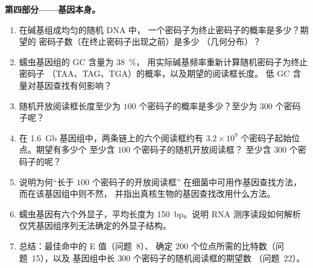 \begin{problem}
\medskip
\noindent\textbf{第四部分——基因本身。}
\begin{enumerate}[resume]
  \item 在碱基组成均匀的随机 DNA 中，
        一个密码子为终止密码子的概率是多少？期望的
        密码子数（在终止密码子出现之前）是多少
        （几何分布）？
  \item 蠕虫基因组的 GC 含量为 \qty{38}{\%}，
        用实际碱基频率重新计算随机密码子为终止密码子
        （TAA、TAG、TGA）的概率，以及期望的阅读框长度。
        低 GC 含量对基因查找有何影响？
  \item 随机开放阅读框长度至少为
        $100$ 个密码子的概率是多少？至少为 $300$ 个密码子呢？
  \item 在 \qty{1.6}{Gb} 基因组中，两条链上的六个阅读框约有
        $3.2\times 10^{9}$ 个密码子起始位点。期望有多少个
        至少含 $100$ 个密码子的随机开放阅读框？
        至少含 $300$ 个密码子的呢？
  \item 说明为何“长于 $100$ 个密码子的开放阅读框”
        在细菌中可用作基因查找方法，而在该基因组中则不然，
        并指出真核生物的基因查找改用什么方法。
  \item 蠕虫基因有六个外显子，平均长度为 \qty{150}{bp}。说明
        RNA 测序读段如何解析
        仅凭基因组序列无法确定的外显子结构。
  \item 总结：最佳命中的 E 值（问题~8）、
        确定 $200$ 个位点所需的比特数（问题~15），以及
        基因组中长 $300$ 个密码子的随机阅读框的期望数
        （问题~22）。
\end{enumerate}
\end{problem}
